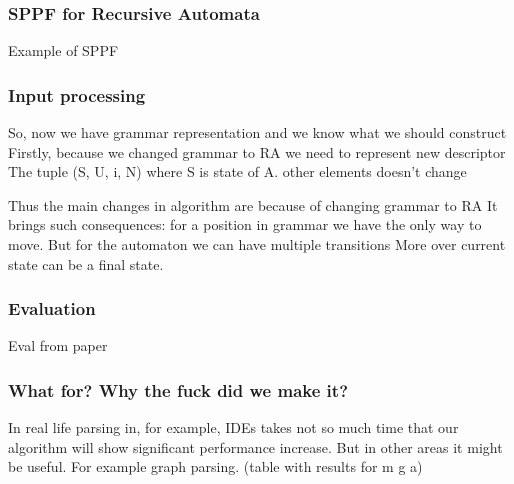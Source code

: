 \documentclass{beamer}
\begin{document}
	\begin{frame} 
		\frametitle{SPPF for Recursive Automata}
		Example of SPPF
	\end{frame}
	
	\begin{frame} 
		\frametitle{Input processing}
		So, now we have grammar representation and we know what we should construct
		Firstly, because we changed grammar to RA we need to 
		represent new descriptor
		The tuple (S, U, i, N) where S is state of A. other elements doesn't change 
		
		Thus the main changes in algorithm are because of changing grammar to RA
		It brings such consequences:
		for a position in grammar we have the only way to move. But for the automaton we can have multiple transitions
		More over current state can be a final state.  
	\end{frame}
	
	\begin{frame} 
		\frametitle{Evaluation}
		Eval from paper
	\end{frame}
	
	\begin{frame} 
		\frametitle{What for? Why the fuck did we make it?} 
		
		In real life parsing in, for example, IDEs takes not so much time that our algorithm will show significant performance increase. 
		But in other areas it might be useful. 
		For example graph parsing. (table with results for m g a) 
	\end{frame} 
	
\end{document}
